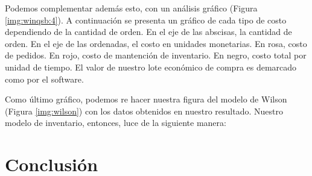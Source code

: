Podemos complementar además esto, con un análisis gráfico (Figura \ref{img:winqsb:4}). A continuación se presenta un gráfico de cada tipo de costo dependiendo de la cantidad de orden. En el eje de las abscisas, la cantidad de orden. En el eje de las ordenadas, el costo en unidades monetarias. En rosa, costo de pedidos. En rojo, costo de mantención de inventario. En negro, costo total por unidad de tiempo. El valor de nuestro lote económico de compra es demarcado como  por el software.


Como último gráfico, podemos re hacer nuestra figura del modelo de Wilson (Figura \ref{img:wilson}) con los datos obtenidos en nuestro resultado. Nuestro modelo de inventario, entonces, luce de la siguiente manera:



\clearpage

\section{Conclusión}

\clearpage


